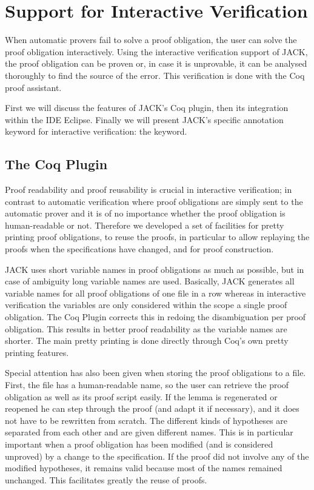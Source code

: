 

\section{Support for Interactive Verification}\label{SecInteractive}
When automatic provers fail to solve a proof obligation,
the user can %
 solve the proof obligation interactively.
Using the interactive verification support of JACK,
the proof obligation can be proven or, in case it is unprovable, it
can be analysed thoroughly to find the source of the error.
This verification is done with the Coq proof assistant. 

First we will discuss the features of JACK's Coq plugin, then its 
integration within the IDE Eclipse. Finally we will present
 JACK's specific annotation keyword for interactive verification: the 
\native keyword. 

\subsection{The Coq Plugin}
Proof readability and proof reusability is crucial in interactive 
verification; in contrast to automatic verification 
where proof obligations are simply sent to the automatic prover 
and it is of no importance whether the proof obligation is human-readable or not.
Therefore we developed a set of facilities for pretty printing proof obligations, 
to reuse the proofs, in particular to allow replaying the proofs 
when the specifications have changed, and for proof construction.

JACK uses short variable names in proof obligations as much as possible, 
but in case of ambiguity long variable names are used.
Basically, JACK generates all variable names for all proof obligations of one 
file in a row whereas in interactive verification the variables are only 
considered within the scope a single proof obligation.
The Coq Plugin corrects this in redoing the disambiguation per proof 
obligation.
This results in better proof readability as the variable names are shorter.
The main pretty printing is done directly through Coq's own pretty printing 
features. 


Special attention has also been given when storing the proof obligations 
to a file. First, the file has a human-readable name, so the user can retrieve 
the proof obligation as well as its proof script easily. 
If the lemma is regenerated or reopened he can step through the proof 
(and adapt it if necessary), 
and it does not have to be rewritten from scratch.
The different kinds of hypotheses are separated from each other and
are given different names.
This is in particular important when a proof obligation has been modified 
(and is considered unproved) by a change to the specification. 
If the proof did not involve any of the modified hypotheses,
it remains valid because most of the names remained
unchanged. This facilitates greatly the reuse of proofs.

